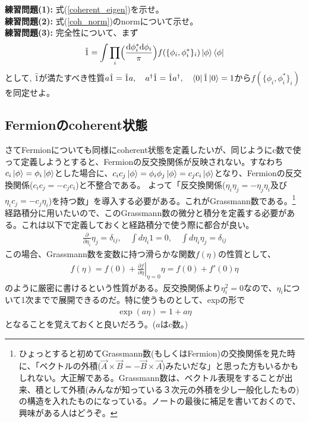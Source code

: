 \documentclass[a4paper,12pt]{jsarticle}
\newcommand{\p}{\partial}
\begin{document}
\begin{mdframed}[linewidth=1pt]
\textbf{練習問題(1):} 式(\ref{coherent_eigen})を示せ。\\
\textbf{練習問題(2):} 式(\ref{coh_norm})のnormについて示せ。\\
\textbf{練習問題(3):} 完全性について、まず
\begin{eqnarray}
  \hat{1} = \int \prod_i \Bigl(\frac{\mathrm{d}\phi_i^*\mathrm{d}\phi_i}{\pi}\Bigr) f(\{\phi_i, \phi_i^*\}_i) \ket{\phi}\bra{\phi}
\end{eqnarray}
として, $\hat{1}$が満たすべき性質$a \hat{1} = \hat{1}a, \quad a^\dagger \hat{1} = \hat{1}a^\dagger, \quad \bra{0}\hat{1}\ket{0} = 1$から$f(\{\phi_i, \phi_i^*\}_i)$を同定せよ。
\end{mdframed}


\subsection{Fermionのcoherent状態}
さてFermionについても同様にcoherent状態を定義したいが、同じようにc数で使って定義しようとすると、Fermionの反交換関係が反映されない。すなわち$c_i\ket{\phi} = \phi_i\ket{\phi}$とした場合に、$c_ic_j\ket{\phi} = \phi_i\phi_j\ket{\phi} = c_jc_i\ket{\phi}$となり、Fermionの反交換関係($c_ic_j = -c_jc_i$)と不整合である。
よって「反交換関係($\eta_i \eta_j = -\eta_j\eta_i$及び$\eta_i c_j = - c_j\eta_i$)を持つ数」を導入する必要がある。これがGrassmann数である。\footnote{ひょっとすると初めてGrassmann数(もしくはFermion)の交換関係を見た時に、「ベクトルの外積($\vec{A}\times\vec{B} = - \vec{B}\times\vec{A}$)みたいだな」と思った方もいるかもしれない。大正解である。Grassmann数は、ベクトル表現をすることが出来、積として外積(みんなが知っている３次元の外積を少し一般化したもの)の構造を入れたものになっている。ノートの最後に補足を書いておくので、興味がある人はどうぞ。}
経路積分に用いたいので、このGrassmann数の微分と積分を定義する必要がある。これは以下で定義しておくと経路積分で使う際に都合が良い。
\begin{eqnarray}
  \frac{\p}{\p\eta_i} \eta_j = \delta_{ij}, \quad \int d\eta_i 1 = 0, \quad \int d\eta_i \eta_j = \delta_{ij}\label{grass_ana}
\end{eqnarray}
この場合、Grassmann数を変数に持つ滑らかな関数$f(\eta)$の性質として、
\begin{eqnarray}
  f(\eta) = f(0) + \left.\frac{\p f}{\p\eta}\right|_{\eta=0}\eta = f(0) + f'(0)\eta
\end{eqnarray}
のように厳密に書けるという性質がある。反交換関係より$\eta_i^2 = 0$なので、$\eta_i$について1次までで展開できるのだ。特に使うものとして、expの形で
\begin{eqnarray}
  \exp(a \eta) = 1 + a\eta
\end{eqnarray}
となることを覚えておくと良いだろう。($a$はc数。)
\end{document}
